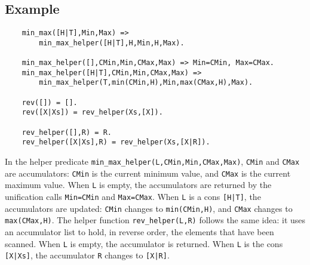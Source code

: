 \subsection*{Example}
\begin{verbatim}
    min_max([H|T],Min,Max) => 
        min_max_helper([H|T],H,Min,H,Max).

    min_max_helper([],CMin,Min,CMax,Max) => Min=CMin, Max=CMax.
    min_max_helper([H|T],CMin,Min,CMax,Max) => 
        min_max_helper(T,min(CMin,H),Min,max(CMax,H),Max).

    rev([]) = [].
    rev([X|Xs]) = rev_helper(Xs,[X]).

    rev_helper([],R) = R.
    rev_helper([X|Xs],R) = rev_helper(Xs,[X|R]).
\end{verbatim}
In the helper predicate \texttt{min\_max\_helper(L,CMin,Min,CMax,Max)}, \texttt{CMin} and \texttt{CMax} are accumulators: \texttt{CMin} is the current minimum value, and \texttt{CMax} is the current maximum value. When \texttt{L} is empty, the accumulators are returned by the unification calls \texttt{Min=CMin} and \texttt{Max=CMax}. When \texttt{L} is a cons \texttt{[H|T]}, the accumulators are updated: \texttt{CMin} changes to \texttt{min(CMin,H)}, and \texttt{CMax} changes to \texttt{max(CMax,H)}. The helper function \texttt{rev\_helper(L,R)} follows the same idea: it uses an accumulator list to hold, in reverse order, the elements that have been scanned. When \texttt{L} is empty, the accumulator is returned. When \texttt{L} is the cons \texttt{[X|Xs]}, the accumulator \texttt{R} changes to \texttt{[X|R]}.
\ignore{

}


